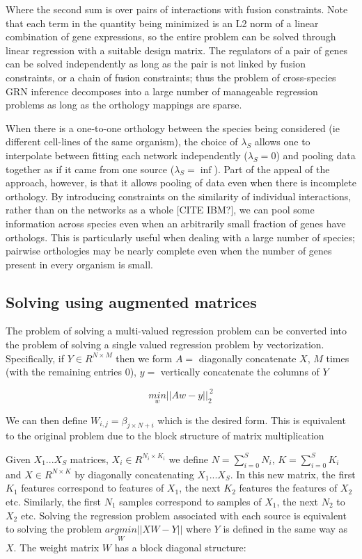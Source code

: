 \documentclass[11pt]{article}
\begin{document}
Where the second sum is over pairs of interactions with fusion constraints. Note that each term in the quantity being minimized is an L2 norm of a linear combination of gene expressions, so the entire problem can be solved through linear regression with a suitable design matrix. The regulators of a pair of genes can be solved independently as long as the pair is not linked by fusion constraints, or a chain of fusion constraints; thus the problem of cross-species GRN inference decomposes into a large number of manageable regression problems as long as the orthology mappings are sparse.


When there is a one-to-one orthology between the species being considered (ie different cell-lines of the same organism), the choice of $\lambda_S$ allows one to interpolate between fitting each network independently ($\lambda_S=0$) and pooling data together as if it came from one source ($\lambda_S=\inf$). Part of the appeal of the approach, however, is that it allows pooling of data even when there is incomplete orthology. By introducing constraints on the similarity of individual interactions, rather than on the networks as a whole [CITE IBM?], we can pool some information across species even when an arbitrarily small fraction of genes have orthologs. This is particularly useful when dealing with a large number of species; pairwise orthologies may be nearly complete even when the number of genes present in every organism is small. 

\subsection{Solving using augmented matrices}
The problem of solving a multi-valued regression problem can be converted into the problem of solving a single valued regression problem by vectorization.
Specifically, if $Y \in R^{N \times M}$ then we form $A =$ diagonally concatenate $X$, $M$ times (with the remaining entries 0),
$y =$ vertically concatenate the columns of $Y$

$$\underset{w}{min} ||Aw - y||_2^{~2}$$

We can then define $W_{i,j} = \beta_{j \times N + i}$ which is the desired form.
This is equivalent to the original problem due to the block structure of matrix multiplication

Given $X_1... X_S$ matrices, $X_i \in R^{N_i \times K_i}$ we define $N = \sum_{i=0}^S N_i$, $K = \sum_{i=0}^SK_i$ and $X \in R^{N \times K}$ by diagonally concatenating $X_1...X_S$.
In this new matrix, the first $K_1$ features correspond to features of $X_1$, the next $K_2$ features the features of $X_2$ etc.
Similarly, the first $N_1$ samples correspond to samples of $X_1$, the next $N_2$ to $X_2$ etc.
Solving the regression problem associated with each source is equivalent to solving the problem $\underset{W}{argmin}||XW-Y||$ where $Y$ is defined in the same way as $X$.
The weight matrix $W$ has a block diagonal structure:
\end{document}
